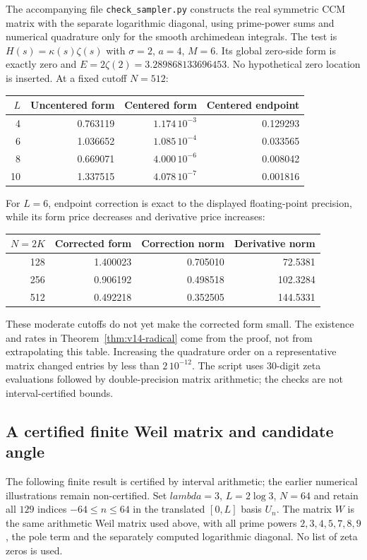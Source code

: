 \documentclass[11pt]{article}
\def\lambda{lambda}%
\theoremstyle{remark}
\begin{document}
The accompanying file \texttt{check\_sampler.py} constructs the real symmetric CCM matrix with the
separate logarithmic diagonal, using prime-power sums and numerical
quadrature only for the smooth archimedean integrals. The test is
$H(s)=\kappa(s)\zeta(s)$ with $\sigma=2$, $a=4$, $M=6$. Its global
zero-side form is exactly zero and $E=2\zeta(2)=3.289868133696453$.
No hypothetical zero location is inserted. At a fixed cutoff $N=512$:
\begin{center}
\begin{tabular}{rrrr}
\toprule
$L$ & Uncentered form & Centered form & Centered endpoint\\
\midrule
4 & 0.763119 & $1.174\,10^{-3}$ & 0.129293\\
6 & 1.036652 & $1.085\,10^{-4}$ & 0.033565\\
8 & 0.669071 & $4.000\,10^{-6}$ & 0.008042\\
10 & 1.337515 & $4.078\,10^{-7}$ & 0.001816\\
\bottomrule
\end{tabular}
\end{center}
For $L=6$, endpoint correction is exact to the displayed floating-point
precision, while its form price decreases and derivative price increases:
\begin{center}
\begin{tabular}{rrrr}
\toprule
$N=2K$ & Corrected form & Correction norm & Derivative norm\\
\midrule
128 & 1.400023 & 0.705010 & 72.5381\\
256 & 0.906192 & 0.498518 & 102.3284\\
512 & 0.492218 & 0.352505 & 144.5331\\
\bottomrule
\end{tabular}
\end{center}
These moderate cutoffs do not yet make the corrected form small. The
existence and rates in Theorem~\ref{thm:v14-radical} come from the proof, not
from extrapolating this table. Increasing the quadrature order on a
representative matrix changed entries by less than $2\,10^{-12}$.
The script uses 30-digit zeta evaluations followed by double-precision
matrix arithmetic; the checks are not interval-certified bounds.


\subsection{A certified finite Weil matrix and candidate angle}
\label{app:v112-certificate}
The following finite result is certified by interval arithmetic; the
earlier numerical illustrations remain non-certified. Set
$\lambda=3$, $L=2\log3$, $N=64$ and retain all $129$ indices
$-64\le n\le64$ in the translated $[0,L]$ basis $U_n$.
The matrix $W$ is the same arithmetic Weil matrix used above, with all
prime powers $2,3,4,5,7,8,9$, the pole term and the separately computed
logarithmic diagonal. No list of zeta zeros is used.
\end{document}
